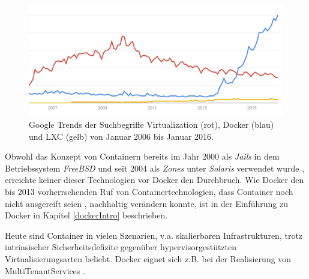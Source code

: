 \documentclass[../main.tex]{subfiles}
\begin{document}
  \begin{figure}[h]
      \centering
      \includegraphics[width=1.0\textwidth]{./images/googletrend_dockerVirtualizationLXC.jpg}
      \caption{Google Trends der Suchbegriffe \glqq{}Virtualization\grqq{} (rot), \glqq{}Docker\grqq{} (blau) und \glqq{}LXC\grqq{} (gelb) von Januar 2006 bis Januar 2016\cite{googleTrends}.}
      \label{fig:overview_googleTrends}
  \end{figure}

  Obwohl das Konzept von Containern bereits im Jahr 2000 als \emph{Jails} in dem Betriebssystem \emph{FreeBSD} und seit 2004 als \emph{Zones} unter \emph{Solaris} verwendet wurde \cite{zonesReleasenotes}\cite{jailsReleasenotes}, erreichte keiner dieser Technologien vor Docker den Durchbruch. Wie Docker den bis 2013 vorherrschenden Ruf von Containertechnologien, dass Container noch nicht ausgereift seien \cite[S.8]{containerVirtPerformance}, nachhaltig verändern konnte, ist in der Einführung zu Docker in Kapitel \ref{dockerIntro} beschrieben.

  Heute sind Container in vielen Szenarien, v.a. skalierbaren Infrastrukturen, trotz intrinsischer Sicherheitsdefizite gegenüber hypervisorgestützten Virtualisierungsarten beliebt. Docker eignet sich z.B. bei der Realisierung von \glspl{MultiTenantService} \cite[S.6]{dockerBook}\cite{dockerUnderstandingDocker}.

\end{document}
